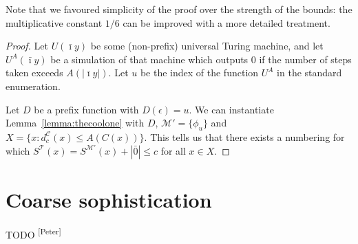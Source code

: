 \documentclass{style/llncs}
\newcommand{\M}{\mathscr M}
\newcommand{\C}{\mathscr C}
\newcommand{\T}{\mathscr T}
\newcommand{\s}{S}
\newcommand{\pb}[1]{\textcolor{OliveGreen}{\small #1 \textsuperscript{[Peter]} }}
\begin{document}
Note that we favoured simplicity of the proof over the strength of the bounds: the multiplicative constant $1/6$ can be improved with a more detailed treatment.

\depth*
\begin{proof}
Let $U(\bar\imath y)$ be some (non-prefix) universal Turing machine, and let $U^A(\bar\imath y)$ be a simulation of that machine which outputs $0$ if the number of steps taken exceeds $A(|\bar\imath y|)$. Let $u$ be the index of the function $U^A$ in the standard enumeration.

Let $D$ be a prefix function with $D(\epsilon) = u$. We can instantiate Lemma~\ref{lemma:thecoolone} with $D$, $\M' = \{\phi_u\}$ and $X = \{x : d^\C_c(x) \leq A(C(x))\}$. This tells us that there exists a numbering for which $\s^\T(x) = \s^{\M'}(x) + |\bar0| \leq c$ for all $x \in X$.
\end{proof}

\section{Coarse sophistication}

\pb{TODO}
\end{document}
